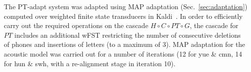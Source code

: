 \label{sec:ptadapt}

{\color{blue} The {\sc PT-adapt} system was
  adapted using MAP adaptation (Sec.~\ref{sec:adaptation})
  computed over weighted finite state transducers in }
Kaldi~\cite{Kaldi2011}. In order to efficiently carry out the required
operations on the cascade $H\circ C\circ PT\circ G$,
the cascade for $PT$ includes an
additional wFST restricting the number of consecutive deletions of
phones and insertions of letters (to a maximum of 3).
MAP adaptation for
the acoustic model was carried out for a number of iterations (12 for
yue \& cmn, 14 for hun \& swh, with a re-alignment stage in iteration
10).
